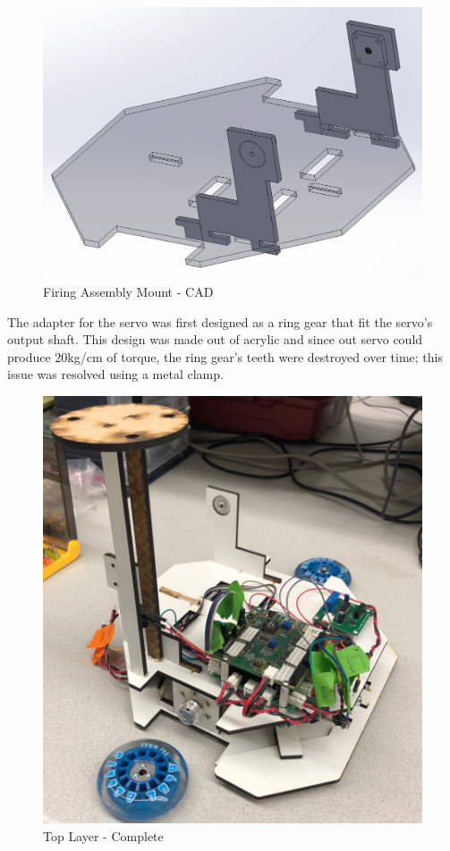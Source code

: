 \documentclass{article}
\begin{document}
\begin{figure}[H]
    \centering
    \includegraphics[width = 5in]{TopLayerFiringMechMount.PNG}
    \caption{Firing Assembly Mount - CAD}
    \label{fig:FiringAssemblyMountCAD}
\end{figure}

The adapter for the servo was first designed as a ring gear that fit the servo's output shaft. This design was made out of acrylic and since out servo could produce 20kg/cm of torque, the ring gear's teeth were destroyed over time; this issue was resolved using a metal clamp.

\begin{figure}[H]
    \centering
    \includegraphics[width = 5in]{TopLayerComplete.jpg}
    \caption{Top Layer - Complete}
    \label{fig:TopLayerComplete}
\end{figure}
\end{document}

